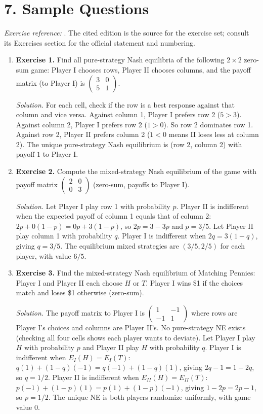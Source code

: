 \section*{7. Sample Questions}
\emph{Exercise reference:} \cite{game_theory_ref1}. The cited edition is the source for the exercise set; consult its Exercises section for the official statement and numbering.
\begin{enumerate}[leftmargin=*,itemsep=0.9em]
\item \textbf{Exercise 1.} Find all pure-strategy Nash equilibria of the following $2\times 2$ zero-sum game: Player I chooses rows, Player II chooses columns, and the payoff matrix (to Player I) is $\begin{pmatrix}3&0\\5&1\end{pmatrix}$.

\emph{Solution.} For each cell, check if the row is a best response against that column and vice versa. Against column 1, Player I prefers row 2 ($5>3$). Against column 2, Player I prefers row 2 ($1>0$). So row 2 dominates row 1. Against row 2, Player II prefers column 2 ($1<0$ means II loses less at column 2). The unique pure-strategy Nash equilibrium is (row 2, column 2) with payoff $1$ to Player I.

\item \textbf{Exercise 2.} Compute the mixed-strategy Nash equilibrium of the game with payoff matrix $\begin{pmatrix}2&0\\0&3\end{pmatrix}$ (zero-sum, payoffs to Player I).

\emph{Solution.} Let Player I play row 1 with probability $p$. Player II is indifferent when the expected payoff of column 1 equals that of column 2: $2p+0(1-p)=0p+3(1-p)$, so $2p=3-3p$ and $p=3/5$. Let Player II play column 1 with probability $q$. Player I is indifferent when $2q=3(1-q)$, giving $q=3/5$. The equilibrium mixed strategies are $(3/5,2/5)$ for each player, with value $6/5$.

\item \textbf{Exercise 3.} Find the mixed-strategy Nash equilibrium of Matching Pennies: Player I and Player II each choose $H$ or $T$. Player I wins \$1 if the choices match and loses \$1 otherwise (zero-sum).

\emph{Solution.} The payoff matrix to Player I is $\begin{pmatrix}1&-1\\-1&1\end{pmatrix}$ where rows are Player I's choices and columns are Player II's. No pure-strategy NE exists (checking all four cells shows each player wants to deviate). Let Player I play $H$ with probability $p$ and Player II play $H$ with probability $q$. Player I is indifferent when $E_I(H)=E_I(T)$: $q(1)+(1-q)(-1)=q(-1)+(1-q)(1)$, giving $2q-1=1-2q$, so $q=1/2$. Player II is indifferent when $E_{II}(H)=E_{II}(T)$: $p(-1)+(1-p)(1)=p(1)+(1-p)(-1)$, giving $1-2p=2p-1$, so $p=1/2$. The unique NE is both players randomize uniformly, with game value $0$.


\end{enumerate}
